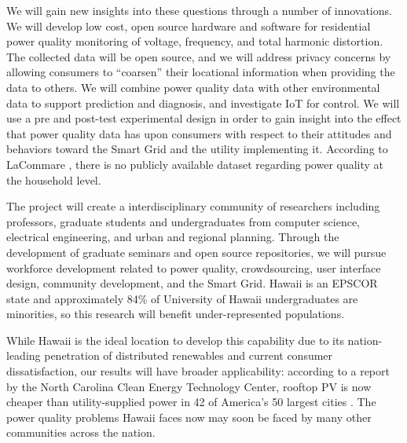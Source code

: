 We will gain new insights into these questions through a number of innovations.  We will develop low cost, open source hardware and software for residential power quality monitoring of voltage, frequency, and total harmonic distortion. The collected data will be open source, and we will address privacy concerns by allowing consumers to ``coarsen'' their locational information when providing the data to others.  We will combine power quality data with other environmental data to support prediction and diagnosis, and investigate IoT for control.  We will use a pre and post-test experimental design in order to gain insight into the effect that power quality data has upon consumers with respect to their attitudes and behaviors toward the Smart Grid and the utility implementing it.  According to LaCommare \cite{LaCommare2004}, there is no publicly available dataset regarding power quality at the household level.

The project will create a interdisciplinary community of researchers including professors, graduate students and undergraduates from computer science, electrical engineering, and urban and regional planning.  Through the development of graduate seminars and open source repositories, we will pursue workforce development related to power quality, crowdsourcing, user interface design, community development, and the Smart Grid. Hawaii is an EPSCOR state and approximately 84\% of University of Hawaii undergraduates are minorities, so this research will benefit under-represented populations.

While Hawaii is the ideal location to develop this capability due to its nation-leading penetration of distributed renewables and current consumer dissatisfaction, our results will have broader applicability: according to a report by the North Carolina Clean Energy Technology Center, rooftop PV is now cheaper than utility-supplied power in 42 of America's 50 largest cities \cite{Kennerly2015}. The power quality problems Hawaii faces now may soon be faced by many other communities across the nation.




